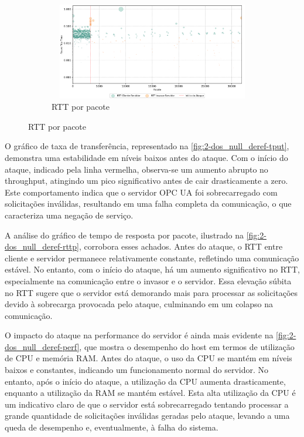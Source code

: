 \begin{figure}[htbp!]
\begin{subfigure}[t]{0.5\textwidth}
    \end{subfigure}%
    ~
    \begin{subfigure}[t]{0.5\textwidth}
        \centering
        \caption{\label{fig:2-dos_null_deref-rttp}RTT por pacote}
        \includegraphics[width=1\textwidth, height=120pt]{USPSC-img/output/cropped/2-dos_function_call_null_deref-rttp.png}
    \end{subfigure}%
\end{figure}

O gráfico de taxa de transferência, representado na \autoref{fig:2-dos_null_deref-tput}, demonstra uma estabilidade em níveis baixos antes do ataque. Com o início do ataque, indicado pela linha vermelha, observa-se um aumento abrupto no throughput, atingindo um pico significativo antes de cair drasticamente a zero. Este comportamento indica que o servidor OPC UA foi sobrecarregado com solicitações inválidas, resultando em uma falha completa da comunicação, o que caracteriza uma negação de serviço.

A análise do gráfico de tempo de resposta por pacote, ilustrado na \autoref{fig:2-dos_null_deref-rttp}, corrobora esses achados. Antes do ataque, o RTT entre cliente e servidor permanece relativamente constante, refletindo uma comunicação estável. No entanto, com o início do ataque, há um aumento significativo no RTT, especialmente na comunicação entre o invasor e o servidor. Essa elevação súbita no RTT sugere que o servidor está demorando mais para processar as solicitações devido à sobrecarga provocada pelo ataque, culminando em um colapso na comunicação.

O impacto do ataque na performance do servidor é ainda mais evidente na \autoref{fig:2-dos_null_deref-perf}, que mostra o desempenho do host em termos de utilização de CPU e memória RAM. Antes do ataque, o uso da CPU se mantém em níveis baixos e constantes, indicando um funcionamento normal do servidor. No entanto, após o início do ataque, a utilização da CPU aumenta drasticamente, enquanto a utilização da RAM se mantém estável. Esta alta utilização da CPU é um indicativo claro de que o servidor está sobrecarregado tentando processar a grande quantidade de solicitações inválidas geradas pelo ataque, levando a uma queda de desempenho e, eventualmente, à falha do sistema.

